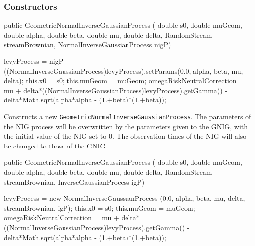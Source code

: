 \subsubsection* {Constructors}
\begin{code}

   public GeometricNormalInverseGaussianProcess (
                                        double s0, double muGeom,
                                        double alpha, double beta,
                                        double mu, double delta,
                                        RandomStream streamBrownian,
                                        NormalInverseGaussianProcess nigP)\begin{hide} {
        levyProcess = nigP;
        ((NormalInverseGaussianProcess)levyProcess).setParams(0.0, alpha, beta, mu, delta);
        this.x0 = s0;
        this.muGeom = muGeom;
        omegaRiskNeutralCorrection =
            mu + delta*((NormalInverseGaussianProcess)levyProcess).getGamma() -
            delta*Math.sqrt(alpha*alpha - (1.+beta)*(1.+beta));
    }\end{hide}
\end{code}
\begin{tabb} Constructs a new \texttt{Geometric\-Normal\-Inverse\-Gaussian\-Process}.
The parameters of the NIG process will be overwritten by the parameters
given to the GNIG, with the initial value of the NIG set to 0.
The observation times of the NIG will also be changed to
those of the GNIG.
\end{tabb}
\begin{code}

   public GeometricNormalInverseGaussianProcess (
                                        double s0, double muGeom,
                                        double alpha, double beta,
                                        double mu, double delta,
                                        RandomStream streamBrownian,
                                        InverseGaussianProcess igP) \begin{hide} {

        levyProcess = new NormalInverseGaussianProcess (0.0, alpha, beta, mu,
                                                        delta, streamBrownian, igP);
        this.x0 = s0;
        this.muGeom = muGeom;
        omegaRiskNeutralCorrection =
            mu + delta*((NormalInverseGaussianProcess)levyProcess).getGamma() -
            delta*Math.sqrt(alpha*alpha - (1.+beta)*(1.+beta));
    }\end{hide}
\end{code}

